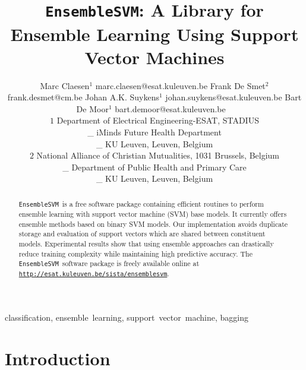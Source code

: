 \documentclass[twoside,11pt]{article}
\newcommand{\esvm}{\texttt{\selectfont EnsembleSVM}}
\begin{document}
\title{\esvm: A Library for Ensemble Learning Using Support Vector
Machines}

\author{\name Marc Claesen$^1$ \email marc.claesen@esat.kuleuven.be  
\AND
\name Frank De Smet$^2$ \email frank.desmet@cm.be
\AND
\name Johan A.K. Suykens$^1$ \email johan.suykens@esat.kuleuven.be 
\AND
\name Bart De Moor$^1$ \email bart.demoor@esat.kuleuven.be \ \\ 
$1$
\addr Department of Electrical Engineering-ESAT, STADIUS \\ 
{\color{white}\_} iMinds Future Health Department \\ %
{\color{white}\_} KU Leuven, Leuven, Belgium \\
$2$
\addr National Alliance of Christian Mutualities, 1031 Brussels,
Belgium  \\
{\color{white}\_} Department of Public Health and Primary Care \\
{\color{white}\_} KU Leuven, Leuven, Belgium}



\maketitle

\begin{abstract}%
\esvm\ is a free software package containing efficient routines to perform
ensemble learning with support vector machine (SVM) base models. It currently
offers ensemble methods based on binary SVM models. Our implementation
avoids duplicate storage and evaluation of support vectors which are shared between constituent models. Experimental results show that using
ensemble approaches can drastically reduce training complexity while maintaining
high predictive accuracy. The \esvm\ software package is freely available online
at \texttt{\url{http://esat.kuleuven.be/sista/ensemblesvm}}.
\end{abstract}

\begin{keywords}
  classification, ensemble~learning, support~vector~machine, bagging %
\end{keywords}

\section{Introduction}
\end{document}
